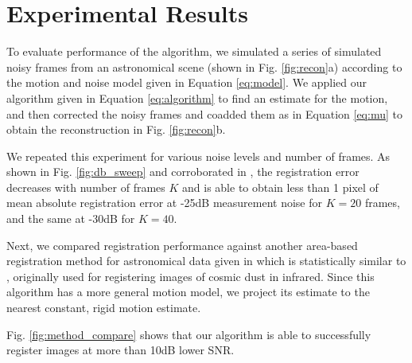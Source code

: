 \documentclass{article}
\begin{document}
\section{Experimental Results}
\label{sec:results}

To evaluate performance of the algorithm, we simulated a series of simulated noisy frames from an astronomical scene (shown in Fig. \ref{fig:recon}a) according to the motion and noise model given in Equation \ref{eq:model}.  We applied our algorithm given in Equation \ref{eq:algorithm} to find an estimate for the motion, and then corrected the noisy frames and coadded them as in Equation \ref{eq:mu} to obtain the reconstruction in Fig. \ref{fig:recon}b.

We repeated this experiment for various noise levels and number of frames.  As shown in Fig. \ref{fig:db_sweep} and corroborated in \cite{gratadour2005sub}, the registration error decreases with number of frames $K$ and is able to obtain less than 1 pixel of mean absolute registration error at -25dB measurement noise for $K=20$ frames, and the same at -30dB for $K=40$.

Next, we compared registration performance against another area-based registration method for astronomical data given in \cite{ginsburg2013bolocam} which is statistically similar to \cite{gratadour2005sub}, originally used for registering images of cosmic dust in infrared.  Since this algorithm has a more general motion model, we project its estimate to the nearest constant, rigid motion estimate.

Fig. \ref{fig:method_compare} shows that our algorithm is able to successfully register images at more than 10dB lower SNR.
\end{document}
